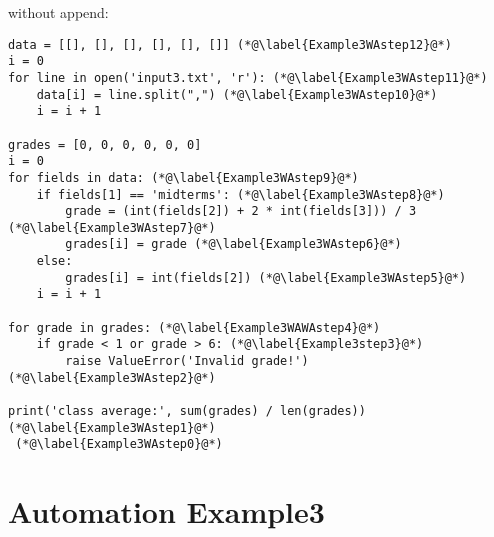 \documentclass[11pt]{article}
\begin{document}
without append:

\begin{lstlisting}
data = [[], [], [], [], [], []] (*@\label{Example3WAstep12}@*) 
i = 0
for line in open('input3.txt', 'r'): (*@\label{Example3WAstep11}@*) 
    data[i] = line.split(",") (*@\label{Example3WAstep10}@*) 
    i = i + 1

grades = [0, 0, 0, 0, 0, 0]
i = 0
for fields in data: (*@\label{Example3WAstep9}@*) 
    if fields[1] == 'midterms': (*@\label{Example3WAstep8}@*) 
        grade = (int(fields[2]) + 2 * int(fields[3])) / 3 (*@\label{Example3WAstep7}@*) 
        grades[i] = grade (*@\label{Example3WAstep6}@*) 
    else:
        grades[i] = int(fields[2]) (*@\label{Example3WAstep5}@*) 
    i = i + 1

for grade in grades: (*@\label{Example3WAWAstep4}@*) 
    if grade < 1 or grade > 6: (*@\label{Example3step3}@*) 
        raise ValueError('Invalid grade!') (*@\label{Example3WAstep2}@*) 

print('class average:', sum(grades) / len(grades)) (*@\label{Example3WAstep1}@*) 
 (*@\label{Example3WAstep0}@*) 
\end{lstlisting}



\section{Automation Example3}
\end{document}

